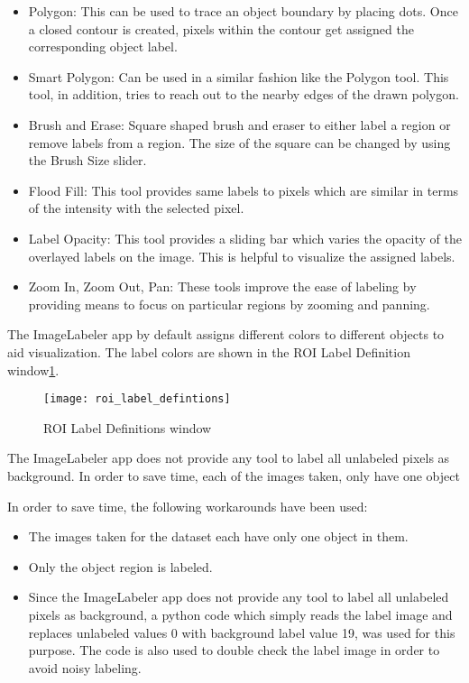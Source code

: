 \documentclass[paper=a4,11pt,parskip=half,toc=listof]{scrartcl}
\begin{document}
	\begin{itemize}
		\item Polygon: This can be used to trace an object boundary by placing dots. Once a closed contour is created, pixels within the contour get assigned the corresponding object label.
		\item Smart Polygon: Can be used in a similar fashion like the Polygon tool. This tool, in addition, tries to reach out to the nearby edges of the drawn polygon.
		\item Brush and Erase: Square shaped brush and eraser to either label a region or remove labels from a region. The size of the square can be changed by using the Brush Size slider.
		\item Flood Fill: This tool provides same labels to pixels which are similar in terms of the intensity with the selected pixel.
		\item Label Opacity: This tool provides a sliding bar which varies the opacity of the overlayed labels on the image. This is helpful to visualize the assigned labels.
		\item Zoom In, Zoom Out, Pan: These tools improve the ease of labeling by providing means to focus on particular regions by zooming and panning.
	\end{itemize}
	
The ImageLabeler app by default assigns different colors to different objects to aid visualization. The label colors are shown in the ROI Label Definition window\ref{Fig:4}.
	\begin{figure}[htb!]
		\centering
		\texttt{[image: roi\_label\_defintions]}
		\caption{ROI Label Definitions window}
		\label{Fig:4}
	\end{figure}
	
The ImageLabeler app does not provide any tool to label all unlabeled pixels as background. In order to save time, each of the images taken, only have one object

In order to save time, the following workarounds have been used:
	\begin{itemize}
		\item The images taken for the dataset each have only one object in them.
		\item Only the object region is labeled.
		\item Since the ImageLabeler app does not provide any tool to label all unlabeled pixels as background, a python code which simply reads the label image and replaces unlabeled values 0 with background label value 19, was used for this purpose. The code is also used to double check the label image in order to avoid noisy labeling.
	\end{itemize}
	
\end{document}
